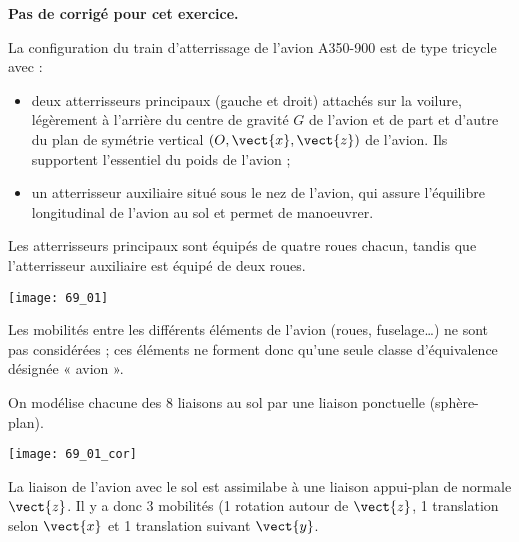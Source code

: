 \normaltrue \difficilefalse \tdifficilefalse
\correctiontrue

\exer{ $\star$ \label{B2:16:69}}
\setcounter{numques}{0}


\ifcorrection
\else
\textbf{Pas de corrigé pour cet exercice.}
\fi

\ifprof
\else
La configuration du train d’atterrissage de l’avion A350-900 est de type tricycle avec :
\begin{itemize}
\item deux atterrisseurs principaux (gauche et droit) attachés sur la voilure, légèrement à
l’arrière du centre de gravité $G$ de l’avion et de part et d’autre du plan de symétrie
vertical $\left(O, \vect{x}, \vect{z}\right)$ de l'avion. Ils supportent l’essentiel du poids de l’avion ;
\item un atterrisseur auxiliaire situé sous le nez de l’avion, qui assure l’équilibre longitudinal
de l’avion au sol et permet de manoeuvrer.
\end{itemize}
Les atterrisseurs principaux sont équipés de quatre roues chacun, tandis que
l’atterrisseur auxiliaire est équipé de deux roues.



\begin{center}
\texttt{[image: 69\_01]}
\end{center}

Les mobilités entre les différents éléments de l’avion (roues,
fuselage…) ne sont pas considérées ; ces éléments ne forment donc qu’une seule
classe d’équivalence désignée « avion ».

\fi

On modélise chacune des 8 liaisons au sol par une liaison ponctuelle (sphère-plan).
\ifprof
\begin{center}
\texttt{[image: 69\_01\_cor]}
\end{center}
\else 
\fi

\ifprof
La liaison de l'avion avec le sol est assimilabe à une liaison appui-plan de normale $\vect{z}$. Il y a donc 3 mobilités (1 rotation autour de $\vect{z}$, 1 translation selon $\vect{x}$ et 1 translation suivant $\vect{y}$.

